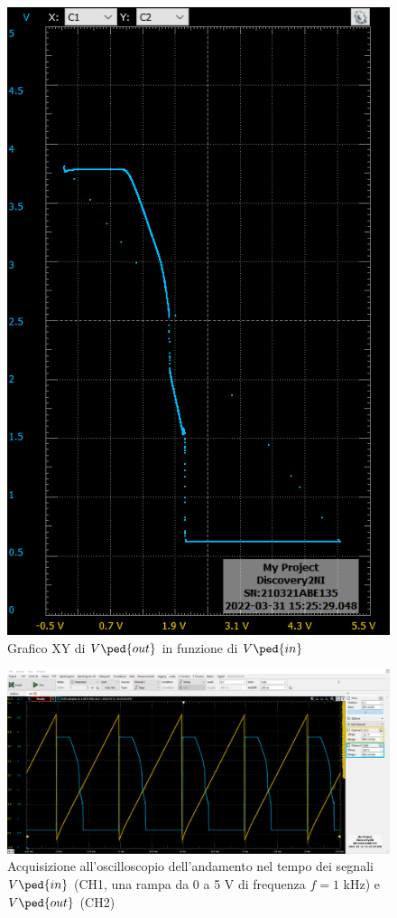 \documentclass[10pt, a4paper, italian]{article}
\begin{document}
\begin{figure}[htbp]
\centering
	\includegraphics[scale=0.4]{not_xy1}
	\caption{Grafico XY di $V\ped{out}$ in funzione di $V\ped{in}$}
\end{figure}
\begin{figure}[htbp]
\centering
	\includegraphics[width=\textwidth]{not_time1}
	\caption{Acquisizione all'oscilloscopio dell'andamento nel tempo dei
	segnali $V\ped{in}$ (CH1, una rampa da 0 a 5 V di frequenza $f = 1$ kHz)
	e $V\ped{out}$ (CH2)}
\end{figure}
\end{document}

